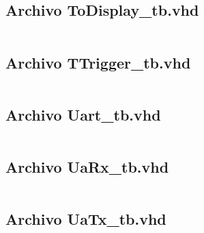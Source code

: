 \documentclass[12pt]{article}
\begin{document}
\subsection{Archivo \textbf{ToDisplay\_tb.vhd }}
\inputminted[bgcolor=bgcodecolor,xleftmargin=20pt,breaklines,linenos,fontsize=\scriptsize]{vhdl}{../GHDL/ToDisplay_tb.vhd}
\newpage

\subsection{Archivo \textbf{TTrigger\_tb.vhd }}
\inputminted[bgcolor=bgcodecolor,xleftmargin=20pt,breaklines,linenos,fontsize=\scriptsize]{vhdl}{../GHDL/TTrigger_tb.vhd}
\newpage

\subsection{Archivo \textbf{Uart\_tb.vhd }}
\inputminted[bgcolor=bgcodecolor,xleftmargin=20pt,breaklines,linenos,fontsize=\scriptsize]{vhdl}{../GHDL/Uart_tb.vhd}
\newpage

\subsection{Archivo \textbf{UaRx\_tb.vhd }}
\inputminted[bgcolor=bgcodecolor,xleftmargin=20pt,breaklines,linenos,fontsize=\scriptsize]{vhdl}{../GHDL/UaRx_tb.vhd}
\newpage

\subsection{Archivo \textbf{UaTx\_tb.vhd }}
\inputminted[bgcolor=bgcodecolor,xleftmargin=20pt,breaklines,linenos,fontsize=\scriptsize]{vhdl}{../GHDL/UaTx_tb.vhd}
\newpage
\end{document}
